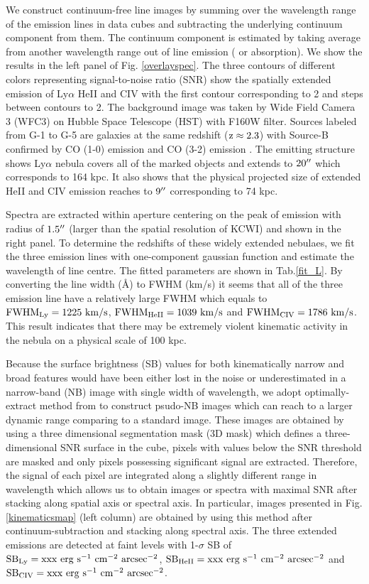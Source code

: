 \documentclass[../Results.tex]{subfiles}
\begin{document}
We construct continuum-free line images by summing over the wavelength range of the emission lines in data cubes and subtracting the underlying continuum component from them. The continuum component is estimated by taking average from another wavelength range out of line emission ( or absorption). We show the results in the left panel of Fig. \ref{overlayspec}. The three contours of different colors representing signal-to-noise ratio (SNR) show the spatially extended emission of Ly$\alpha$ HeII and CIV with the first contour corresponding to 2 and steps between contours to 2. The background image was taken by Wide Field Camera 3 (WFC3) on Hubble Space Telescope (HST) with F160W filter. Sources labeled from G-1 to G-5 are galaxies at the same redshift ($\rm z \approx 2.3$) with Source-B confirmed by CO (1-0) emission and CO (3-2) emission \citep{emonts2019cold,qiongli2020}. The emitting structure shows Ly$\alpha$ nebula covers all of the marked objects and extends to $\rm 20\mbox{$^{\prime\prime}$}$ which corresponds to 164 kpc. It also shows that the physical projected size of extended HeII and CIV emission reaches to $9 \mbox{$^{\prime\prime}$}$ corresponding to 74 kpc.

Spectra are extracted within aperture centering on the peak of emission with radius of $1.5\mbox{$^{\prime\prime}$}$ (larger than the spatial resolution of KCWI) and shown in the right panel. To determine the redshifts of these widely extended nebulaes, we fit the three emission lines with one-component gaussian function and estimate the wavelength of line centre. The fitted parameters are shown in Tab.\ref{fit_L}. By converting the line width (\AA) to FWHM (km/s) it seems that all of the three emission line have a relatively large FWHM which equals to $\rm FWHM_{Ly}=1225 \ km/s$, $\rm FWHM_{HeII}=1039 \ km/s$ and $\rm FWHM_{CIV}=1786 \ km/s$. This result indicates that there may be extremely violent kinematic activity in the nebula on a physical scale of 100 kpc.

Because the surface brightness (SB) values for both kinematically narrow and broad features would have been either lost in the noise or underestimated in a narrow-band (NB) image with single width of wavelength, we adopt optimally-extract method from \citet{borisova2016ubiquitous} to construct psudo-NB images which can reach to a larger dynamic range comparing to a standard image. These images are obtained by using a three dimensional segmentation mask (3D mask) which defines a three-dimensional SNR surface in the cube, pixels with values below the SNR threshold are masked and only pixels possessing significant signal are extracted. Therefore, the signal of each pixel are integrated along a slightly different range in wavelength which allows us to obtain images or spectra with maximal SNR after stacking along spatial axis or spectral axis. In particular, images presented in Fig. \ref{kinematicsmap} (left column) are obtained by using this method after continuum-subtraction and stacking along spectral axis. The three extended emissions are detected at faint levels with 1-$\sigma$ SB of $\rm SB_{Ly}=xxx \ erg \ s^{-1} \ cm^{-2} \ arcsec^{-2}$, $\rm SB_{HeII}=xxx \ erg \ s^{-1} \ cm^{-2} \ arcsec^{-2}$ and $\rm SB_{CIV}=xxx \ erg \ s^{-1} \ cm^{-2} \ arcsec^{-2}$. 
\end{document}
